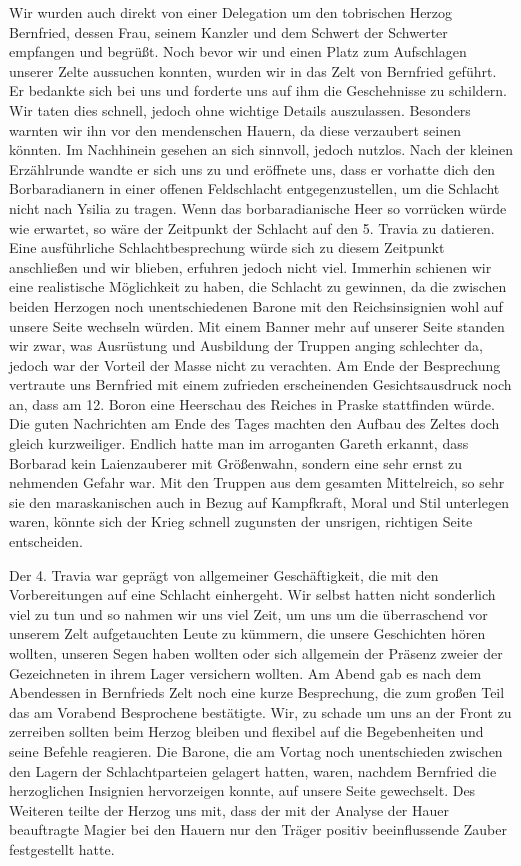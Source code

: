 Wir wurden auch direkt von einer Delegation um den tobrischen Herzog Bernfried, dessen Frau, seinem Kanzler und dem Schwert der Schwerter empfangen und begrüßt. Noch bevor wir und einen Platz zum Aufschlagen unserer Zelte aussuchen konnten, wurden wir in das Zelt von Bernfried geführt. Er bedankte sich bei uns und forderte uns auf ihm die Geschehnisse zu schildern. Wir taten dies schnell, jedoch ohne wichtige Details auszulassen. Besonders warnten wir ihn vor den mendenschen Hauern, da diese verzaubert seinen könnten. Im Nachhinein gesehen an sich sinnvoll, jedoch nutzlos. Nach der kleinen Erzählrunde wandte er sich uns zu und eröffnete uns, dass er vorhatte dich den Borbaradianern in einer offenen Feldschlacht entgegenzustellen, um die Schlacht nicht nach Ysilia zu tragen. Wenn das borbaradianische Heer so vorrücken würde wie erwartet, so wäre der Zeitpunkt der Schlacht auf den 5. Travia zu datieren. Eine ausführliche Schlachtbesprechung würde sich zu diesem Zeitpunkt anschließen und wir blieben, erfuhren jedoch nicht viel. Immerhin schienen wir eine realistische Möglichkeit zu haben, die Schlacht zu gewinnen, da die zwischen beiden Herzogen noch unentschiedenen Barone mit den Reichsinsignien wohl auf unsere Seite wechseln würden. Mit einem Banner mehr auf unserer Seite standen wir zwar, was Ausrüstung und Ausbildung der Truppen anging schlechter da, jedoch war der Vorteil der Masse nicht zu verachten. Am Ende der Besprechung vertraute uns Bernfried mit einem zufrieden erscheinenden Gesichtsausdruck noch an, dass am 12. Boron eine Heerschau des Reiches in Praske stattfinden würde. Die guten Nachrichten am Ende des Tages machten den Aufbau des Zeltes doch gleich kurzweiliger. Endlich hatte man im arroganten Gareth erkannt, dass Borbarad kein Laienzauberer mit Größenwahn, sondern eine sehr ernst zu nehmenden Gefahr war. Mit den Truppen aus dem gesamten Mittelreich, so sehr sie den maraskanischen auch in Bezug auf Kampfkraft, Moral und Stil unterlegen waren, könnte sich der Krieg schnell zugunsten der unsrigen, richtigen Seite entscheiden.

Der 4. Travia war geprägt von allgemeiner Geschäftigkeit, die mit den Vorbereitungen auf eine Schlacht einhergeht. Wir selbst hatten nicht sonderlich viel zu tun und so nahmen wir uns viel Zeit, um uns um die überraschend vor unserem Zelt aufgetauchten Leute zu kümmern, die unsere Geschichten hören wollten, unseren Segen haben wollten oder sich allgemein der Präsenz zweier der Gezeichneten in ihrem Lager versichern wollten. Am Abend gab es nach dem Abendessen in Bernfrieds Zelt noch eine kurze Besprechung, die zum großen Teil das am Vorabend Besprochene bestätigte. Wir, zu schade um uns an der Front zu zerreiben sollten beim Herzog bleiben und flexibel auf die Begebenheiten und seine Befehle reagieren. Die Barone, die am Vortag noch unentschieden zwischen den Lagern der Schlachtparteien gelagert hatten, waren, nachdem Bernfried die herzoglichen Insignien hervorzeigen konnte, auf unsere Seite gewechselt. Des Weiteren teilte der Herzog uns mit, dass der mit der Analyse der Hauer beauftragte Magier bei den Hauern nur den Träger positiv beeinflussende Zauber festgestellt hatte.

